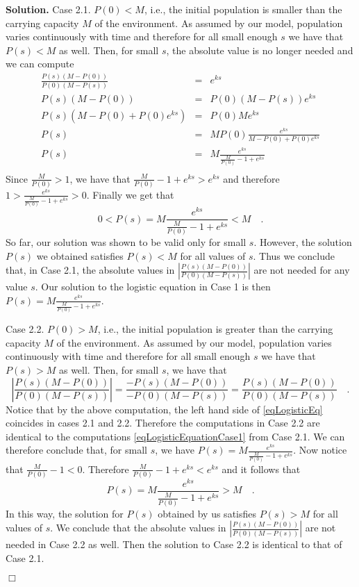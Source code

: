 \documentclass[12pt]{book}
\newenvironment{solution}{\medskip\noindent\textbf{Solution.} }{$\Box$}
\begin{document}
\begin{solution}
\noindent Case 2.1. $P(0)<M$, i.e., the initial population is smaller than the carrying capacity $M$ of the environment. As assumed by our model, population varies continuously with time and therefore for all small enough $s $ we have that $P(s)<M$ as well. Then, for small $s$, the absolute value is no longer needed and we can compute
\begin{equation}\label{eqLogisticEquationCase1}
\begin{array}{rcl}
\displaystyle \frac{ P(s)(M-P(0))}{P(0)(M-P(s))}&=&\displaystyle e^{ks} \\
\displaystyle P(s)(M-P(0)) &=& \displaystyle  P(0)(M-P(s))e^{ks}\\
\displaystyle P(s)(M-P(0)+P(0)e^{ks})&=&\displaystyle P(0)M e^{ks}\\
\displaystyle P(s)&=&\displaystyle  MP(0) \frac{e^{ks}}{M-P(0)+P(0)e^{ks}} \\
\displaystyle P(s)&=&\displaystyle  M \frac{e^{ks}}{\frac{M}{P(0)}-1+e^{ks}} \\
\end{array}
\end{equation}
Since $\frac{M}{P(0)}>1 $, we have that $\frac{M}{P(0)}-1+e^{ks}>e^{ks}$ and therefore $ 1>\frac{e^{ks}}{\frac{M}{P(0)}-1+e^{ks}}>0 $. Finally we get that
\[
0<P(s)= M \frac{e^{ks}}{\frac{M}{P(0)}-1+e^{ks}} <M\quad .
\]
So far, our solution was shown to be valid only for small $s$. However, the solution $P(s)$ we obtained satisfies $P(s)<M$ for all values of $s$. Thus we conclude that, in Case 2.1, the absolute values in $ \left|\frac{ P(s)(M-P(0))}{P(0)(M-P(s))}\right|$ are not needed for any value $s$. Our solution to the logistic equation in Case 1 is then $\displaystyle P(s)=\displaystyle  M \frac{e^{ks}}{ \frac{M}{P(0)} -1+ e^{ks}}$.


\noindent Case 2.2. $P(0)>M$, i.e., the initial population is greater than the carrying capacity $M$ of the environment. As assumed by our model, population varies continuously with time and therefore for all small enough $s $ we have that $P(s)>M$ as well. Then, for small $s$, we  have that
\[
\left|\frac{ P(s)(M-P(0))}{P(0)(M-P(s))}\right|=\frac{-P(s)(M-P(0))}{-P(0)(M-P(s))}=\frac{ P(s)(M-P(0))}{P(0)(M-P(s))} \quad .
\]
Notice that by the above computation, the left hand side of \eqref{eqLogisticEq} coincides in cases 2.1 and 2.2. Therefore the computations in Case 2.2 are identical to the computations \eqref{eqLogisticEquationCase1} from Case 2.1. We can therefore conclude that, for small $s$, we have $\displaystyle P(s)=\displaystyle  M \frac{e^{ks}}{\frac{M}{P(0)}-1+e^{ks}} $. Now notice that $\frac{M}{P(0)}-1<0$. Therefore $ \frac{M}{ P(0) }-1+e^{ks} < e^{ks}$ and it follows that
\[
P(s)= M \frac{e^{ks}}{\frac{M}{P(0)}-1+e^{ks}} >M\quad .
\]
In this way, the solution for $P(s)$ obtained by us satisfies $P(s)>M$ for all values of $s$. We conclude that the absolute values in $ \left|\frac{ P(s)(M-P(0))}{P(0)(M-P(s))}\right|$ are not needed in Case 2.2 as well. Then the solution to Case 2.2 is identical to that of Case 2.1.


\end{solution}
\end{document}
